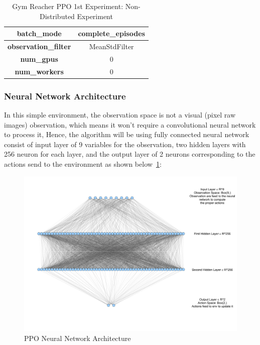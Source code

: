 \begin{table}[!htb]
\begin{tabular}{|c|l|l|c|l|l|}
				\multicolumn{3}{|c|}{\textbf{batch\_mode}}                          & \multicolumn{3}{c|}{complete\_episodes}                                             \\ \hline
				\multicolumn{3}{|c|}{\textbf{observation\_filter}}                  & \multicolumn{3}{c|}{MeanStdFilter}                                                  \\ \hline
				\multicolumn{3}{|c|}{\cellcolor[HTML]{C0C0C0}\textbf{num\_gpus}}    & \multicolumn{3}{c|}{\cellcolor[HTML]{C0C0C0}0}                                      \\ \hline
				\multicolumn{3}{|c|}{\cellcolor[HTML]{C0C0C0}\textbf{num\_workers}} & \multicolumn{3}{c|}{\cellcolor[HTML]{C0C0C0}0}                                      \\ \hline
		\end{tabular}
		\caption{Gym Reacher PPO 1st Experiment: Non-Distributed Experiment}
		\label{tab:gym_reacher_ppo_1st_exp}
\end{table}


\subsubsection{Neural Network Architecture}
In this simple environment, the observation space is not a visual (pixel raw images) observation, which means it won't require a convolutional neural network to process it, Hence, the algorithm will be using fully connected neural network consist of input layer of 9 variables for the observation, two hidden layers with 256 neuron for each layer, and the output layer of 2 neurons corresponding to the actions send to the environment as shown below~\ref{fig:ppo_nn}:

\begin{figure}[!htb]
		\centering
		\includegraphics[width=\linewidth]{figures/exps/1st_exp/ppo_nn}
		\caption{PPO Neural Network Architecture}
		\label{fig:ppo_nn}
\end{figure}


